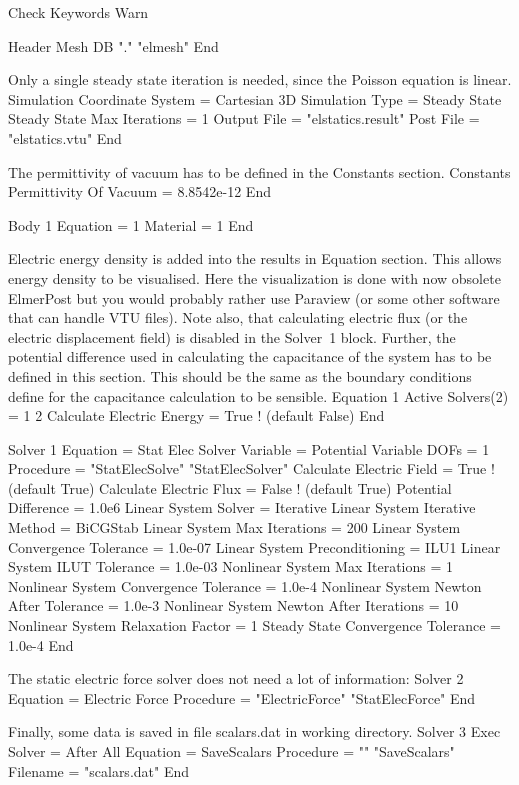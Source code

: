\ttbegin
Check Keywords Warn

Header
  Mesh DB "." "elmesh"
End
\ttend

Only a single steady state iteration is needed, since the Poisson
equation is linear.
\ttbegin
Simulation
  Coordinate System = Cartesian 3D
  Simulation Type = Steady State
  Steady State Max Iterations = 1
  Output File = "elstatics.result"
  Post File = "elstatics.vtu"
End
\ttend

The permittivity of vacuum has to be defined in the Constants section.
\ttbegin
Constants
  Permittivity Of Vacuum = 8.8542e-12
End

Body 1
  Equation = 1
  Material = 1
End
\ttend

Electric energy density is added into the results in Equation
section. This allows energy density to be visualised.
Here the visualization is done with now obsolete ElmerPost
but you would probably rather use Paraview (or some other software that
can handle VTU files). 
Note also, that calculating electric flux (or the electric
displacement field) is disabled in the Solver~1 block. Further, the
potential difference used in calculating the capacitance of the system
has to be defined in this section. This should be the same as the
boundary conditions define for the capacitance calculation to be
sensible.
\ttbegin
Equation 1
  Active Solvers(2) = 1 2
  Calculate Electric Energy = True  ! (default False)
End

Solver 1
  Equation = Stat Elec Solver
  Variable = Potential
  Variable DOFs = 1
  Procedure = "StatElecSolve" "StatElecSolver"
  Calculate Electric Field = True  ! (default True)
  Calculate Electric Flux = False  ! (default True)
  Potential Difference = 1.0e6
  Linear System Solver = Iterative
  Linear System Iterative Method = BiCGStab
  Linear System Max Iterations = 200
  Linear System Convergence Tolerance = 1.0e-07
  Linear System Preconditioning = ILU1
  Linear System ILUT Tolerance = 1.0e-03
  Nonlinear System Max Iterations = 1
  Nonlinear System Convergence Tolerance = 1.0e-4
  Nonlinear System Newton After Tolerance = 1.0e-3
  Nonlinear System Newton After Iterations = 10
  Nonlinear System Relaxation Factor = 1
  Steady State Convergence Tolerance = 1.0e-4
End
\ttend

The static electric force solver does not need a lot of
information:
\ttbegin
Solver 2
  Equation = Electric Force
  Procedure = "ElectricForce" "StatElecForce"
End
\ttend

Finally, some data is saved in file scalars.dat in working directory.
\ttbegin
Solver 3
  Exec Solver = After All
  Equation = SaveScalars
  Procedure = "" "SaveScalars"
  Filename = "scalars.dat"
End
\ttend


